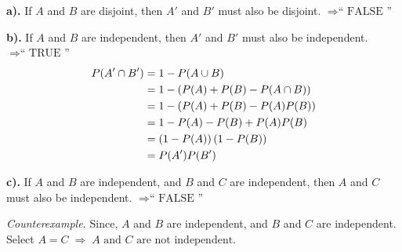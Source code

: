 \documentclass[a4paper, 10pt]{article}
\begin{document}
\begin{solution}
\par\noindent\textbf{a).} If \(A\) and \(B\) are disjoint, then \(A'\) and \(B'\) must also be disjoint. \(\Rightarrow \boxed{\text{`` FALSE ''}}\)
\begin{center}
\end{center}

\par\noindent\textbf{b).} If \(A\) and \(B\) are independent, then \(A'\) and \(B'\) must also be independent.  \(\Rightarrow \boxed{\text{`` TRUE ''}}\)
\proof
\begin{align*}
    P(A' \cap B') &= 1 - P(A \cup B) \\
    &= 1 - (P(A) + P(B) - P(A \cap B)) \\
    &= 1 - (P(A) + P(B) - P(A)P(B)) \\
    &= 1 - P(A) - P(B) + P(A)P(B) \\
    &= \left(1 - P(A)\right)\left(1 - P(B)\right) \\
    &= P(A')P(B')
\end{align*}

\par\noindent\textbf{c).} If \(A\) and \(B\) are independent, and \(B\) and \(C\) are independent, then \(A\) and \(C\) must also be independent.  \(\Rightarrow \boxed{\text{`` FALSE ''}}\)
\vspace{2mm}
\par\textit{Counterexample.}
Since, \(A\) and \(B\) are independent, and \(B\) and \(C\) are independent. \\
Select \(A = C \; \Rightarrow \; \boxed{A \text{ and } C \text{ are not independent}} \).

\end{solution}
\end{document}
